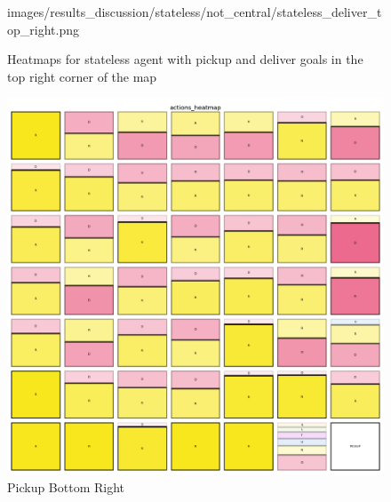 \begin{figure}[!ht]
\begin{minipage}[b]{0.45\textwidth}
{      images/results_discussion/stateless/not_central/stateless_deliver_top_right.png
    }
    \caption{Deliver Top Right}
    \label{fig:stateless_deliver_top_right}
  \end{minipage}
  \caption{Heatmaps for stateless agent with pickup and deliver goals in the top
  right corner of the map}
  \label{fig:stateless_top_right}
\end{figure}
\vspace{5mm}

\begin{figure}[!ht]
  \centering
  \begin{minipage}[b]{0.45\textwidth}
    \centering
    \includegraphics[width=\textwidth]{
      images/results_discussion/stateless/not_central/stateless_pickup_bottom_right.png
    }
    \caption{Pickup Bottom Right}
    \label{fig:stateless_pickup_bottom_right}
  \end{minipage}
  \hfill
  \begin{minipage}[b]{0.45\textwidth}
    \centering

\end{minipage}
\end{figure}
